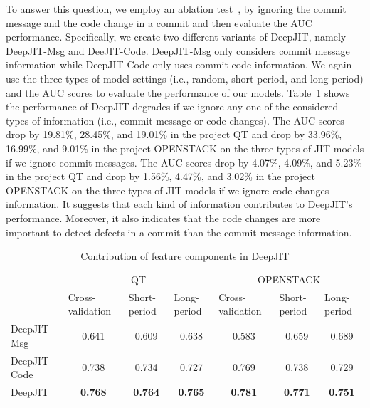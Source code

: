 To answer this question, we employ an ablation test~\cite{korbar2017deep, liu2017deep}, by ignoring the commit message and the code change in a commit and then evaluate the AUC performance. Specifically, we create two different variants of DeepJIT, namely DeepJIT-Msg and DeeJIT-Code. DeepJIT-Msg only considers commit message information while DeepJIT-Code only uses commit code information. We again use the three types of model settings (i.e., random, short-period, and long period) and the AUC scores to evaluate the performance of our models. Table~\ref{tab:variants} shows the performance of DeepJIT degrades if we ignore any one of the considered types of information (i.e., commit message or code changes). The AUC scores drop by 19.81\%, 28.45\%, and 19.01\% in the project QT and drop by 33.96\%, 16.99\%, and 9.01\% in the project OPENSTACK on the three types of JIT models if we ignore commit messages. The AUC scores drop by 4.07\%, 4.09\%, and 5.23\% in the project QT and drop by 1.56\%, 4.47\%, and 3.02\% in the project OPENSTACK on the three types of JIT models if we ignore code changes information. It suggests that each kind of information contributes to DeepJIT's performance. Moreover, it also indicates that the code changes are more important to detect defects in a commit than the commit message information.  

\begin{table}[t!]
  \centering
  \caption{Contribution of feature components in DeepJIT}
    \begin{tabular}{|l|c|c|c|c|c|c|}
    \hline
    \multirow{2}[4]{*}{} & \multicolumn{3}{c|}{QT} & \multicolumn{3}{c|}{OPENSTACK} \\
\cline{2-7}          & \multicolumn{1}{l|}{Cross-validation} & \multicolumn{1}{l|}{Short-period} & \multicolumn{1}{l|}{Long-period} & \multicolumn{1}{l|}{Cross-validation} & \multicolumn{1}{l|}{Short-period} & \multicolumn{1}{l|}{Long-period} \\
    \hline
    \hline
    DeepJIT-Msg & 0.641 & 0.609 & 0.638 & 0.583 & 0.659 & 0.689 \\
    \hline
    DeepJIT-Code & 0.738 & 0.734 & 0.727 & 0.769 & 0.738 & 0.729 \\
    \hline
    DeepJIT & \textbf{0.768} & \textbf{0.764} & \textbf{0.765} & \textbf{0.781} & \textbf{0.771} & \textbf{0.751} \\
    \hline
    \end{tabular}%
  \label{tab:variants}%

\end{table}%

